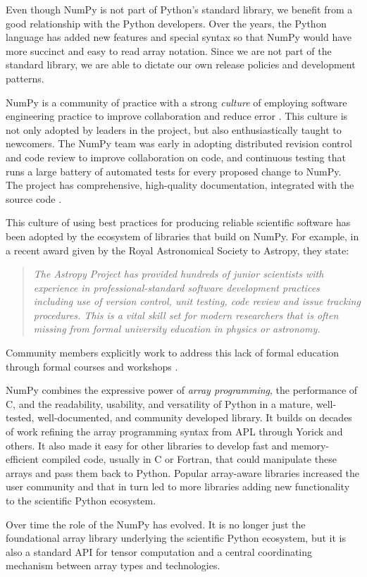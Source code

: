 Even though NumPy is not part of Python's standard library,
we benefit from a good relationship with the Python developers.
Over the years, the Python language has added new features and
special syntax so that NumPy would have more succinct and 
easy to read array notation.
Since we are not part of the standard library, we are able to
dictate our own release policies and development patterns.

NumPy is a community of practice with a strong \emph{culture} of
employing software engineering practice to improve collaboration and
reduce error \cite{millman2014developing}.  This culture is not only
adopted by leaders in the project, but also enthusiastically taught to
newcomers. The NumPy team was early in adopting distributed revision
control and code review to improve collaboration on code, and
continuous testing that runs a large battery of automated tests for
every proposed change to NumPy.  The project has comprehensive,
high-quality documentation, integrated with the source
code \cite{vanderwalt2008scipy,harrington2008scipy,harrington2009scipy}.


This culture of using best practices for producing reliable scientific software
has been adopted by the ecosystem of libraries that build on NumPy.
For example, in a recent award given by the Royal Astronomical Society to
Astropy, they state:
\begin{quotation}
\noindent\emph{The Astropy Project has provided hundreds of junior scientists
with experience in professional-standard software development practices
including use of version control, unit testing, code review and issue tracking
procedures. This is a vital skill set for modern researchers that is often
missing from formal university education in physics or astronomy.}
\end{quotation}
Community members explicitly work to address this lack of formal education
through formal courses and workshops
\cite{wilson-software-carpentry,hannay-scientific-software-survey,millman2018teaching}.

NumPy combines the expressive power of \emph{array programming}, 
the performance of C, and
the readability, usability, and versatility of Python in a mature,
well-tested, well-documented, and community developed library.
It builds on decades of work refining the array programming
syntax from APL through Yorick and others.
It also made it easy for other libraries to develop fast and
memory-efficient compiled code, usually in C or Fortran, that could manipulate
these arrays and pass them back to Python.
Popular array-aware libraries increased the user community and that
in turn led to more libraries adding new functionality
to the scientific Python ecosystem.


Over time the role of the NumPy has evolved. It is no longer just the
foundational array library underlying the scientific Python ecosystem,
but it is also a standard API for tensor computation and a
central coordinating mechanism between array types and technologies.
